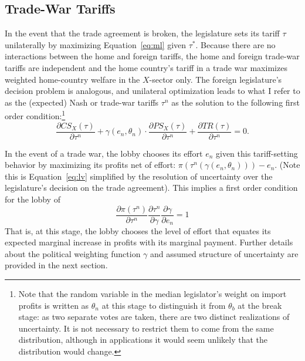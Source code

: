 \documentclass[10pt]{article}
\newcommand{\ve}{\theta}
\newcommand{\ta}{\theta}
\newcommand{\ga}{\gamma}
\begin{document}
\subsection{Trade-War Tariffs}
\label{sec:twt}
In the event that the trade agreement is broken, the legislature sets its tariff $\tau$ unilaterally by maximizing Equation~\ref{eq:ml} given $\tau^*$. Because there are no interactions between the home and foreign tariffs, the home and foreign trade-war tariffs are independent and the home country's tariff in a trade war maximizes weighted home-country welfare in the $X$-sector only. The foreign legislature's decision problem is analogous, and unilateral optimization leads to what I refer to as the (expected) Nash or trade-war tariffs $\tau^n$ as the solution to the following first order condition:\footnote{Note that the random variable in the median legislator's weight on import profits is written as $\ta_n$ at this stage to distinguish it from $\ta_b$ at the break stage: as two separate votes are taken, there are two distinct realizations of uncertainty. It is not necessary to restrict them to come from the same distribution, although in applications it would seem unlikely that the distribution would change.}
\begin{equation}
		\frac{\partial \mathit{CS}_X(\tau)}{\partial \tau^n} + \ga(e_n,\ve_n) \cdot \frac{\partial \mathit{PS}_X(\tau)}{\partial \tau^n} +  \frac{\partial \mathit{TR}(\tau)}{\partial \tau^n} = 0 .
		\label{eq:legfoc}
\end{equation}

In the event of a trade war, the lobby chooses its effort $e_n$ given this tariff-setting behavior by maximizing its profits net of effort: $\pi\left(\tau^n\left(\ga\left(e_n,\ve_n\right)\right)\right) - e_n$. (Note this is Equation~\ref{eq:lv} simplified by the resolution of uncertainty over the legislature's decision on the trade agreement). This implies a first order condition for the lobby of
\begin{equation}
	\frac{\partial \pi(\tau^n)}{\partial \tau^n}\frac{\partial \tau^n}{\partial \ga} \frac{\partial \ga}{\partial e_n} = 1
  \label{eq:lobtw}
\end{equation}
That is, at this stage, the lobby chooses the level of effort that equates its expected marginal increase in profits with its marginal payment. Further details about the political weighting function $\ga$ and assumed structure of uncertainty are provided in the next section.
\end{document}
